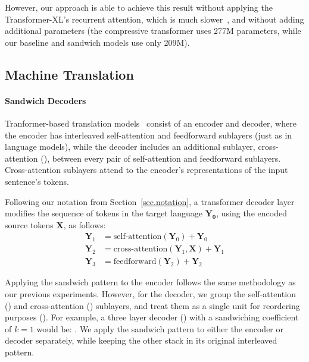 \documentclass[11pt,a4paper]{article}
\begin{document}
However, our approach is able to achieve this result without applying the Transformer-XL's recurrent attention, which is much slower~\citep{Sukhbaatar2019}, and without adding additional parameters (the compressive transformer uses 277M parameters, while our baseline and sandwich models use only 209M).



\subsection{Machine Translation}
\label{sec.nmt}

\paragraph{Sandwich Decoders}
Tranformer-based translation models~\cite{AIAYN} consist of an encoder and decoder, where the encoder has interleaved self-attention and feedforward sublayers (just as in language models), while the decoder includes an additional sublayer, cross-attention ({\Large \texttt{}}), between every pair of self-attention and feedforward sublayers. Cross-attention sublayers attend to the encoder's representations of the input sentence's tokens.

Following our notation from Section~\ref{sec.notation}, a transformer decoder layer modifies the sequence of tokens in the target language $\mathbf{Y_0}$, using the encoded source tokens $\mathbf{X}$, as follows:
\begin{align*}
\mathbf{Y}_1 &= \textrm{self-attention}(\mathbf{Y}_0) + \mathbf{Y}_0\\
\mathbf{Y}_2 &= \textrm{cross-attention}(\mathbf{Y}_1, \mathbf{X}) + \mathbf{Y}_1\\
\mathbf{Y}_3 &= \textrm{feedforward}(\mathbf{Y}_2) + \mathbf{Y}_2
\end{align*}

Applying the sandwich pattern to the encoder follows the same methodology as our previous experiments. However, for the decoder, we group the self-attention ({\Large \texttt{}}) and cross-attention ({\Large \texttt{}}) sublayers, and treat them as a single unit for reordering purposes ({\Large \texttt{}}). For example, a three layer decoder ({\Large \texttt{}}) with a sandwiching coefficient of $k=1$ would be: {\Large \texttt{}}.
We apply the sandwich pattern to either the encoder or decoder separately, while keeping the other stack in its original interleaved pattern.
\end{document}

